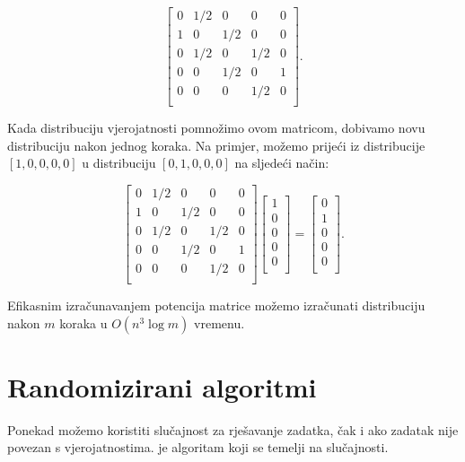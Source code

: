 \[ 
 \begin{bmatrix}
  0 & 1/2 & 0 & 0 & 0 \\
  1 & 0 & 1/2 & 0 & 0 \\
  0 & 1/2 & 0 & 1/2 & 0 \\
  0 & 0 & 1/2 & 0 & 1 \\
  0 & 0 & 0 & 1/2 & 0 \\
 \end{bmatrix}.
\]

Kada distribuciju vjerojatnosti pomnožimo ovom matricom,
dobivamo novu distribuciju nakon jednog koraka.
Na primjer, možemo prijeći iz distribucije
$[1,0,0,0,0]$ u distribuciju
$[0,1,0,0,0]$ na sljedeći način:

\[ 
 \begin{bmatrix}
  0 & 1/2 & 0 & 0 & 0 \\
  1 & 0 & 1/2 & 0 & 0 \\
  0 & 1/2 & 0 & 1/2 & 0 \\
  0 & 0 & 1/2 & 0 & 1 \\
  0 & 0 & 0 & 1/2 & 0 \\
 \end{bmatrix}
 \begin{bmatrix}
  1 \\
  0 \\
  0 \\
  0 \\
  0 \\
 \end{bmatrix}
=
 \begin{bmatrix}
  0 \\
  1 \\
  0 \\
  0 \\
  0 \\
 \end{bmatrix}.
\]

Efikasnim izračunavanjem potencija matrice
možemo izračunati distribuciju nakon $m$ koraka
u $O(n^3 \log m)$ vremenu.

\section{Randomizirani algoritmi}


Ponekad možemo koristiti slučajnost za rješavanje zadatka,
čak i ako zadatak nije povezan s vjerojatnostima.
 je algoritam koji
se temelji na slučajnosti.


